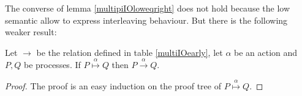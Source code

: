 The converse of lemma \ref{multipiIOloweqright} does not hold because the low semantic allow to express interleaving behaviour. But there is the following weaker result:
\begin{proposition}
  Let $\rightarrow$ be the relation defined in table \ref{multiIOearly}, let $\alpha$ be an action and $P,Q$ be processes. If $P \stackrel{\alpha}{\longmapsto} Q$ then $P\xrightarrow{\alpha} Q$.
  \begin{proof}
    The proof is an easy induction on the proof tree of $P \stackrel{\alpha}{\longmapsto} Q$.
  \end{proof}
\end{proposition}















